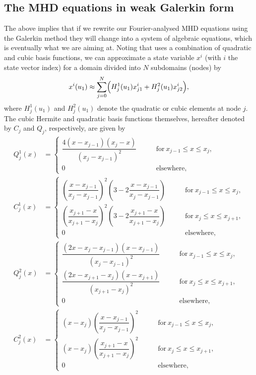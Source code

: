 \subsection{The MHD equations in weak Galerkin form}
The above implies that if we rewrite our Fourier-analysed MHD equations using the Galerkin method they will change into a system of algebraic equations, which is eventually what we are aiming at. Noting that {\legolas} uses a combination of quadratic and cubic basis functions, we can approximate a state variable $x^i$ (with $i$ the state vector index) for a domain divided into $N$ subdomains (nodes) by
\begin{equation} \label{eq: linear_combo}
  x^i(u_1) \approx \sum_{j=0}^N \Bigl(H_j^1(u_1)x_{j1}^i + H_j^2(u_1)x_{j2}^i\Bigr),
\end{equation}
where $H_j^1(u_1)$ and $H_j^2(u_1)$ denote the quadratic or cubic elements at node $j$.
The cubic Hermite and quadratic basis functions themselves, hereafter denoted by $C_j$ and $Q_j$, respectively, are given by
\begingroup
\allowdisplaybreaks
\begin{align}
  Q^1_j(x) &=
  \begin{cases}
    \dfrac{4\left(x - x_{j-1}\right)\left(x_j - x\right)}{\left(x_j - x_{j-1}\right)^2}
    \qquad &\text{for}~ x_{j-1} \leq x \leq x_j,	\\
    0
    \qquad &\text{elsewhere},
  \end{cases} \label{eq: basisfunction_Q1} \\
  C^1_j(x) &=
  \begin{cases}
    \left(\dfrac{x - x_{j-1}}{x_j - x_{j-1}}\right)^2\left(3 - 2\dfrac{x - x_{j-1}}{x_j - x_{j-1}}\right)
    \qquad &\text{for}~ x_{j-1} \leq x \leq x_j,	\\
    \left(\dfrac{x_{j+1} - x}{x_{j+1} - x_j}\right)^2\left(3 - 2\dfrac{x_{j+1} - x}{x_{j+1} - x_j}\right)
    \qquad &\text{for}~ x_j \leq x \leq x_{j+1},	\\
    0
    \qquad &\text{elsewhere},
  \end{cases}	\label{eq: basisfunction_C1} \\
  Q^2_j(x) &=
  \begin{cases}
    \dfrac{\left(2x - x_j - x_{j-1}\right)\left(x - x_{j-1}\right)}{\left(x_j - x_{j-1}\right)^2}
    \qquad &\text{for}~ x_{j-1} \leq x \leq x_j,	\\
    \dfrac{\left(2x - x_{j+1} - x_j\right)\left(x - x_{j+1}\right)}{\left(x_{j+1} - x_j\right)^2}
    \qquad &\text{for}~ x_j \leq x \leq x_{j+1},	\\
    0
    \qquad &\text{elsewhere},
  \end{cases} \label{eq: basisfunction_Q2} \\
  C^2_j(x) &=
  \begin{cases}
    \left(x - x_j\right)\left(\dfrac{x - x_{j-1}}{x_j - x_{j-1}}\right)^2
    \qquad &\text{for}~ x_{j-1} \leq x \leq x_j,	\\
    \left(x - x_j\right)\left(\dfrac{x_{j+1} - x}{x_{j+1} - x_j}\right)^2
    \qquad &\text{for}~ x_j \leq x \leq x_{j+1},	\\
    0
    \qquad &\text{elsewhere},
  \end{cases} \label{eq: basisfunction_C2}
\end{align}
